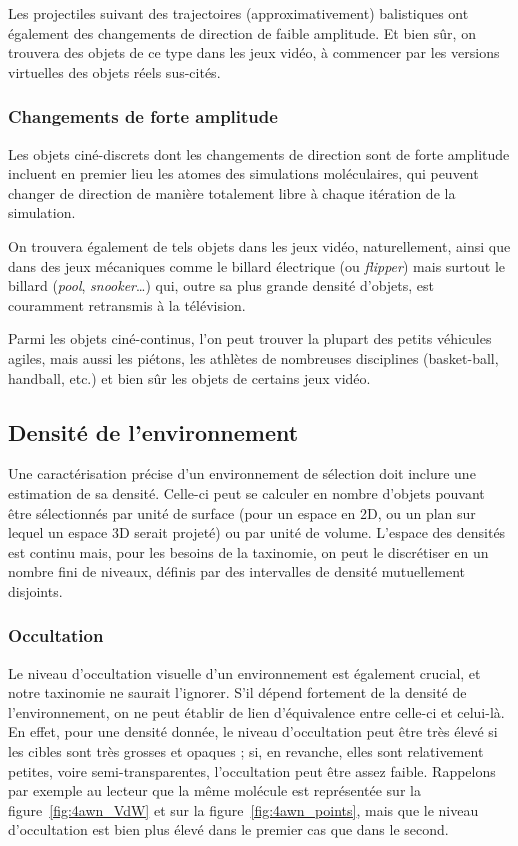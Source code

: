 	Les projectiles suivant des trajectoires (approximativement) balistiques ont également des changements de direction de faible amplitude. Et bien sûr, on trouvera des objets de ce type dans les jeux vidéo, à commencer par les versions virtuelles des objets réels sus-cités.
	
	\subsubsection{Changements de forte amplitude}
	Les objets ciné-discrets dont les changements de direction sont de forte amplitude incluent en premier lieu les atomes des simulations moléculaires, qui peuvent changer de direction de manière totalement libre à chaque itération de la simulation.
	
	On trouvera également de tels objets dans les jeux vidéo, naturellement, ainsi que dans des jeux \og mécaniques \fg{}  comme le billard électrique (ou \emph{flipper}) mais surtout le billard (\emph{pool}, \emph{snooker}\ldots{}) qui, outre sa plus grande densité d'objets, est couramment retransmis à la télévision.
	
	Parmi les objets ciné-continus, l'on peut trouver la plupart des petits véhicules agiles, mais aussi les piétons, les athlètes de nombreuses disciplines (basket-ball, handball, etc.) et bien sûr les objets de certains jeux vidéo.


	\subsection{Densité de l'environnement}
	Une caractérisation précise d'un environnement de sélection doit inclure une estimation de sa densité. Celle-ci peut se calculer en nombre d'objets pouvant être sélectionnés par unité de surface (pour un espace en 2D, ou un plan sur lequel un espace 3D serait projeté) ou par unité de volume. L'espace des densités est continu mais, pour les besoins de la taxinomie, on peut le discrétiser en un nombre fini de niveaux, définis par des intervalles de densité mutuellement disjoints.
	
	\subsubsection{Occultation}
	Le niveau d'occultation visuelle d'un environnement est également crucial, et notre taxinomie ne saurait l'ignorer. S'il dépend fortement de la densité de l'environnement, on ne peut établir de lien d'équivalence entre celle-ci et celui-là. En effet, pour une densité donnée, le niveau d'occultation peut être très élevé si les cibles sont très grosses et opaques ; si, en revanche, elles sont relativement petites, voire semi-transparentes, l'occultation peut être assez faible. Rappelons par exemple au lecteur que la même molécule est représentée sur la figure~\ref{fig:4awn_VdW} et sur la figure~\ref{fig:4awn_points}, mais que le niveau d'occultation est bien plus élevé dans le premier cas que dans le second.
	
